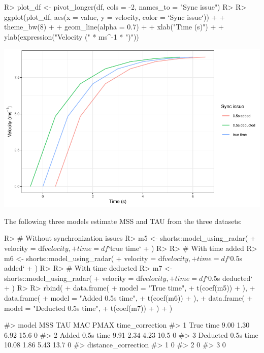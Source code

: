 \documentclass[
]{jss}
\begin{document}
\begin{CodeChunk}
\begin{CodeInput}
R> plot_df <- pivot_longer(df, cols = -2, names_to = "Sync issue")
R> 
R> ggplot(plot_df, aes(x = value, y = velocity, color = `Sync issue`)) +
+   theme_bw(8) +
+   geom_line(alpha = 0.7) +
+   xlab("Time (s)") +
+   ylab(expression("Velocity (" * ms^-1 * ")"))
\end{CodeInput}


\begin{center}\includegraphics[width=1\linewidth]{paper_files/figure-latex/unnamed-chunk-17-1} \end{center}

\end{CodeChunk}

The following three models estimate MSS and TAU from the three datasets:

\begin{CodeChunk}
\begin{CodeInput}
R> # Without synchronization issues
R> m5 <- shorts::model_using_radar(
+   velocity = df$velocity,
+   time = df$`true time`
+ )
R> 
R> # With time added
R> m6 <- shorts::model_using_radar(
+   velocity = df$velocity,
+   time = df$`0.5s added`
+ )
R> 
R> # With time deducted
R> m7 <- shorts::model_using_radar(
+   velocity = df$velocity,
+   time = df$`0.5s deducted`
+ )
R> 
R> rbind(
+   data.frame(
+     model = "True time",
+     t(coef(m5))
+   ),
+   data.frame(
+     model = "Added 0.5s time",
+     t(coef(m6))
+   ),
+   data.frame(
+     model = "Deducted 0.5s time",
+     t(coef(m7))
+   )
+ )
\end{CodeInput}
\begin{CodeOutput}
#>                model   MSS  TAU  MAC PMAX time_correction
#> 1          True time  9.00 1.30 6.92 15.6               0
#> 2    Added 0.5s time  9.91 2.34 4.23 10.5               0
#> 3 Deducted 0.5s time 10.08 1.86 5.43 13.7               0
#>   distance_correction
#> 1                   0
#> 2                   0
#> 3                   0
\end{CodeOutput}
\end{CodeChunk}
\end{document}
